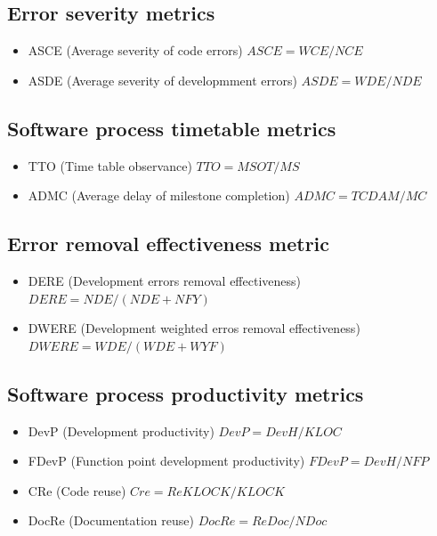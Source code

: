 \documentclass{article}
\begin{document}
\subsection{Error severity metrics}

\begin{itemize}
  \item ASCE (Average severity of code errors) $ ASCE = WCE / NCE$
  \item ASDE (Average severity of developmment errors) $ASDE = WDE / NDE$
\end{itemize}

\subsection{Software process timetable metrics}

\begin{itemize}
  \item TTO (Time table observance) $ TTO = MSOT / MS $
  \item ADMC (Average delay of milestone completion) $ADMC = TCDAM / MC$
\end{itemize}

\subsection{Error removal effectiveness metric}

\begin{itemize}
  \item DERE (Development errors removal effectiveness) $ DERE = NDE / (NDE + NFY)$
  \item DWERE (Development weighted erros removal effectiveness) $ DWERE = WDE / (WDE + WYF)$ 
\end{itemize}

\subsection{Software process productivity metrics}

\begin{itemize}
  \item DevP (Development productivity) $DevP = DevH / KLOC$
  \item FDevP (Function point development productivity) $ FDevP = DevH / NFP$
  \item CRe (Code reuse) $Cre = ReKLOCK / KLOCK$
  \item DocRe (Documentation reuse) $DocRe = ReDoc / NDoc$
\end{itemize}
\end{document}

